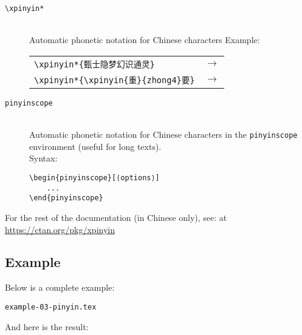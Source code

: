\begin{description}
	\item[\texttt{\textbackslash xpinyin*}] \mbox{}\\
	Automatic phonetic notation for Chinese characters
	Example: \\
	\begin{tabular}{ l l }
		\lstinline|\xpinyin*{甄士隐梦幻识通灵}| 
		& $\rightarrow$ \xpinyin*{甄士隐梦幻识通灵}
		\\
		
		\lstinline|\xpinyin*{\xpinyin{重}{zhong4}要}| 
		& $\rightarrow$ \xpinyin*{\xpinyin{重}{zhong4}要}
		\\	
	\end{tabular}
	
	\item[\texttt{pinyinscope}] \mbox{}\\
	Automatic phonetic notation for Chinese characters in the \texttt{pinyinscope} environment (useful for long texts). \\
	Syntax:
\begin{lstlisting}
\begin{pinyinscope}[⟨options⟩]
	...
\end{pinyinscope}
\end{lstlisting}
\end{description}




For the rest of the documentation (in Chinese only), see: \cite{xpinyin} at\\
\url{https://ctan.org/pkg/xpinyin}


\bigskip
\bigskip
\subsection*{Example}

Below is a complete example:\\

\newpage


\texttt{example-03-pinyin.tex}


\bigskip
\bigskip
And here is the result:

